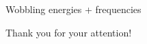\documentclass{beamer}
\begin{document}
\begin{frame}{Wobbling energies + frequencies}
    
\end{frame}


\begin{frame}
\Huge{\centerline{Thank you for your attention!}}
\end{frame}
\end{document}
